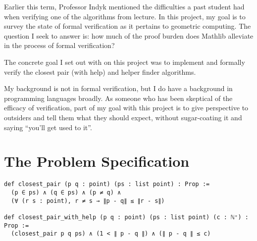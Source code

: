 \documentclass{article}
\begin{document}



Earlier this term, Professor Indyk mentioned the difficulties a past student had when verifying one of the algorithms from lecture.
In this project, my goal is to survey the state of formal verification as it pertains to geometric computing.
The question I seek to answer is: how much of the proof burden does Mathlib alleviate in the process of formal verification?


The concrete goal I set out with on this project was to implement and formally verify the closest pair (with help) and helper finder algorithms.

My background is not in formal verification, but I do have a background in programming languages broadly.
As someone who has been skeptical of the efficacy of verification, part of my goal with this project is to give perspective to outsiders and tell them what they should expect, without sugar-coating it and saying ``you'll get used to it''.

\section{The Problem Specification}
\begin{verbatim}
def closest_pair (p q : point) (ps : list point) : Prop :=
  (p ∈ ps) ∧ (q ∈ ps) ∧ (p ≠ q) ∧
  (∀ (r s : point), r ≠ s → ∥p - q∥ ≤ ∥r - s∥)

def closest_pair_with_help (p q : point) (ps : list point) (c : ℕ⁺) : Prop :=
  (closest_pair p q ps) ∧ (1 < ∥ p - q ∥) ∧ (∥ p - q ∥ ≤ c)
\end{verbatim}
\newpage
\end{document}
